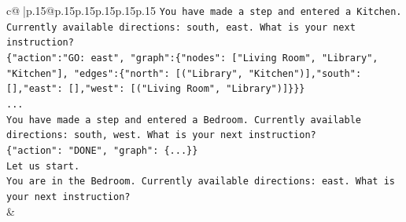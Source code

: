 \documentclass{article}
\begin{document}
{\begin{supertabular}{c@{$\;$}|p{.15\linewidth}@{}p{.15\linewidth}p{.15\linewidth}p{.15\linewidth}p{.15\linewidth}p{.15\linewidth}}
{{{\texttt{You have made a step and entered a Kitchen. Currently available directions: south, east. What is your next instruction?} \\
\texttt{\{"action":"GO: east", "graph":\{"nodes": {[}"Living Room", "Library", "Kitchen"{]}, "edges":\{"north": {[}("Library", "Kitchen"){]},"south": {[}{]},"east": {[}{]},"west": {[}("Living Room", "Library"){]}\}\}\}} \\
\texttt{...} \\
\texttt{You have made a step and entered a Bedroom. Currently available directions: south, west. What is your next instruction?} \\
\texttt{\{"action": "DONE", "graph": \{...\}\}} \\
\texttt{Let us start.} \\
\texttt{You are in the Bedroom. Currently available directions: east. What is your next instruction?} \\
            }
        }
    }
    & \\ \\


\end{supertabular}}
\end{document}
